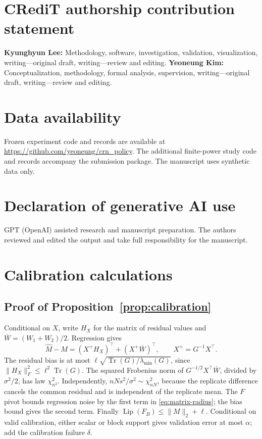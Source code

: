 \documentclass[twocolumn,nameyear]{autart}
\begin{document}
\section*{CRediT authorship contribution statement}
\textbf{Kyunghyun Lee:} Methodology, software, investigation, validation,
visualization, writing---original draft, writing---review and editing.
\textbf{Yeoneung Kim:} Conceptualization, methodology, formal analysis,
supervision, writing---original draft, writing---review and editing.
\section*{Data availability}
Frozen experiment code and records are available at
\url{https://github.com/yeoneung/crn_policy}. The additional finite-power
study code and records accompany the submission package.
The manuscript uses synthetic data only.
\section*{Declaration of generative AI use}
GPT (OpenAI) assisted research and manuscript preparation.
The authors reviewed and edited the output and take full responsibility
for the manuscript.


\appendix
\section{Calibration calculations}\label{app:calibration}
\subsection{Proof of Proposition~\ref{prop:calibration}}\label{app:pivot}
\begin{pf}
Conditional on $X$, write $H_X$ for the matrix of residual values and
$\overline W=(W_1+W_2)/2$. Regression gives
\[
 \widehat M-M=(X^+H_X)^\top+(X^+\overline W)^\top,
 \qquad X^+=G^{-1}X^\top.
\]
The residual bias is at most
$\ell\sqrt{\operatorname{Tr}(G)/\lambda_{\min}(G)}$, since
$\|H_X\|_F^2\le\ell^2\operatorname{Tr}(G)$.
The squared Frobenius norm of $G^{-1/2}X^\top\overline W$, divided by
$\sigma^2/2$, has law $\chi^2_{n^2}$. Independently,
$nNs^2/\sigma^2\sim\chi^2_{nN}$, because the replicate difference
cancels the common residual and is independent of the replicate mean.
The $F$ pivot bounds regression noise by the first term in
\eqref{eq:matrix-radius}; the bias bound gives the second term.
Finally $\operatorname{Lip}(F_B)\le\|M\|_2+\ell$.
Conditional on valid calibration, either scalar or block support gives
validation error at most $\alpha$; add the calibration failure $\delta$.
\end{pf}
\end{document}
